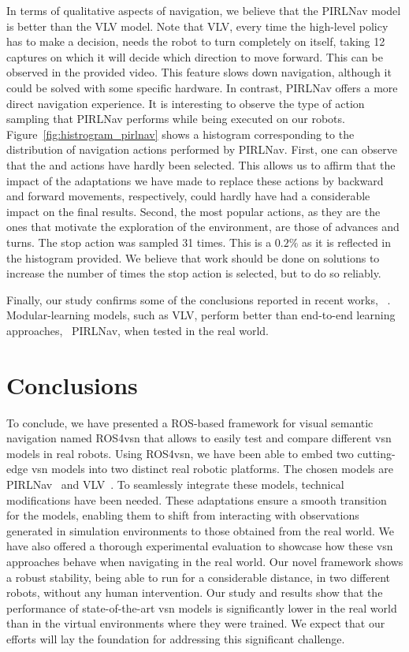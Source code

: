 In terms of qualitative aspects of navigation, we believe that the PIRLNav model is better than the VLV model.
Note that VLV, every time the high-level policy has to make a decision, needs the robot to turn completely on itself, taking 12 captures on which it will decide which direction to move forward.
This can be observed in the provided video.
This feature slows down navigation, although it could be solved with some specific hardware.
In contrast, PIRLNav offers a more direct navigation experience.
It is interesting to observe the type of action sampling that PIRLNav performs while being executed on our robots.
Figure~\ref{fig:histrogram_pirlnav} shows a histogram corresponding to the distribution of navigation actions performed by PIRLNav.
First, one can observe that the \lookup and \lookdown actions have hardly been selected.
This allows us to affirm that the impact of the adaptations we have made to replace these actions by backward and forward movements, respectively, could hardly have had a considerable impact on the final results.
Second, the most popular actions, as they are the ones that motivate the exploration of the environment, are those of advances and turns.
The stop action was sampled 31 times.
This is a $0.2\%$ as it is reflected in the histogram provided.
We believe that work should be done on solutions to increase the number of times the stop action is selected, but to do so reliably.

Finally, our study confirms some of the conclusions reported in recent works, \eg~\cite{gervet2022}.
Modular-learning models, such as VLV, perform better than end-to-end learning approaches, \eg~PIRLNav, when tested in the real world.

\section{Conclusions}\label{sec:conclusions_ros4vsn}
To conclude, we have presented a ROS-based framework for visual semantic navigation named ROS4\acrshort{vsn} that allows to easily test and compare different \acrshort{vsn} models in real robots.
Using ROS4\acrshort{vsn}, we have been able to embed two cutting-edge \acrshort{vsn} models into two distinct real robotic platforms.
The chosen models are PIRLNav~\cite{ramrakhya2023} and VLV~\cite{chang2020}.
To seamlessly integrate these models, technical modifications have been needed.
These adaptations ensure a smooth transition for the models, enabling them to shift from interacting with observations generated in simulation environments to those obtained from the real world.
We have also offered a thorough experimental evaluation to showcase how these \acrshort{vsn} approaches behave when navigating in the real world.
Our novel framework shows a robust stability, being able to run for a considerable distance, in two different robots, without any human intervention.
Our study and results show that the performance of state-of-the-art \acrshort{vsn} models is significantly lower in the real world than in the virtual environments where they were trained.
We expect that our efforts will lay the foundation for addressing this significant challenge.


